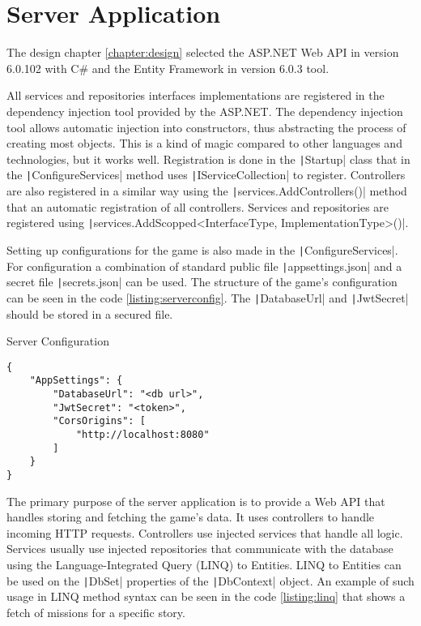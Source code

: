 \section{Server Application}

The design chapter \ref{chapter:design} selected the ASP.NET Web API in version 6.0.102 with C\# and the Entity Framework in version 6.0.3 tool.

All services and repositories interfaces implementations are registered in the dependency injection tool provided by the ASP.NET.
The dependency injection tool allows automatic injection into constructors, thus abstracting the process of creating most objects.
This is a kind of magic compared to other languages and technologies, but it works well.
Registration is done in the \texttt|Startup| class that in the \texttt|ConfigureServices| method uses \texttt|IServiceCollection| to register.
Controllers are also registered in a similar way using the \texttt|services.AddControllers()| method that an automatic registration of all controllers.
Services and repositories are registered using \texttt|services.AddScopped<InterfaceType, ImplementationType>()|.

Setting up configurations for the game is also made in the \texttt|ConfigureServices|.
For configuration a combination of standard public file \texttt|appsettings.json| and a secret file \texttt|secrets.json| can be used.
The structure of the game's configuration can be seen in the code \ref{listing:serverconfig}.
The \texttt|DatabaseUrl| and \texttt|JwtSecret| should be stored in a secured file.

\begin{listing}
    \caption{Server Configuration}
    \label{listing:serverconfig}
    \begin{verbatim}
{
    "AppSettings": {
        "DatabaseUrl": "<db url>",
        "JwtSecret": "<token>",
        "CorsOrigins": [
            "http://localhost:8080"
        ]
    }
}
    \end{verbatim}
\end{listing}

The primary purpose of the server application is to provide a Web API that handles storing and fetching the game's data.
It uses controllers to handle incoming HTTP requests.
Controllers use injected services that handle all logic.
Services usually use injected repositories that communicate with the database using the Language-Integrated Query (LINQ) to Entities.
LINQ to Entities can be used on the \texttt|DbSet| properties of the \texttt|DbContext| object.
An example of such usage in LINQ method syntax can be seen in the code \ref{listing:linq} that shows a fetch of missions for a specific story.


